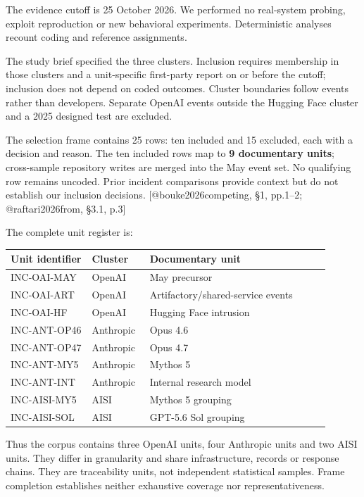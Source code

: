\documentclass[conference]{IEEEtran}
\begin{document}
The evidence cutoff is 25 October 2026. We performed no real-system probing, exploit reproduction or new behavioral experiments. Deterministic analyses recount coding and reference assignments.

The study brief specified the three clusters. Inclusion requires membership in those clusters and a unit-specific first-party report on or before the cutoff; inclusion does not depend on coded outcomes. Cluster boundaries follow events rather than developers. Separate OpenAI events outside the Hugging Face cluster and a 2025 designed test are excluded.

The selection frame contains 25 rows: ten included and 15 excluded, each with a decision and reason. The ten included rows map to \textbf{9 documentary units}; cross-sample repository writes are merged into the May event set. No qualifying row remains uncoded. Prior incident comparisons provide context but do not establish our inclusion decisions. [@bouke2026competing, §1, pp.1--2; @raftari2026from, §3.1, p.3]

The complete unit register is:

\begin{table}[t]\centering\small
\setlength{\tabcolsep}{4pt}
\begin{tabular}{>{\raggedright\arraybackslash}p{0.236\linewidth}>{\raggedright\arraybackslash}p{0.141\linewidth}>{\raggedright\arraybackslash}p{0.518\linewidth}}
\toprule
Unit identifier & Cluster & Documentary unit \\
\midrule
INC-OAI-MAY & OpenAI & May precursor \\
INC-OAI-ART & OpenAI & Artifactory/shared-service events \\
INC-OAI-HF & OpenAI & Hugging Face intrusion \\
INC-ANT-OP46 & Anthropic & Opus 4.6 \\
INC-ANT-OP47 & Anthropic & Opus 4.7 \\
INC-ANT-MY5 & Anthropic & Mythos 5 \\
INC-ANT-INT & Anthropic & Internal research model \\
INC-AISI-MY5 & AISI & Mythos 5 grouping \\
INC-AISI-SOL & AISI & GPT-5.6 Sol grouping \\
\bottomrule
\end{tabular}
\end{table}

Thus the corpus contains three OpenAI units, four Anthropic units and two AISI units. They differ in granularity and share infrastructure, records or response chains. They are traceability units, not independent statistical samples. Frame completion establishes neither exhaustive coverage nor representativeness.
\end{document}
